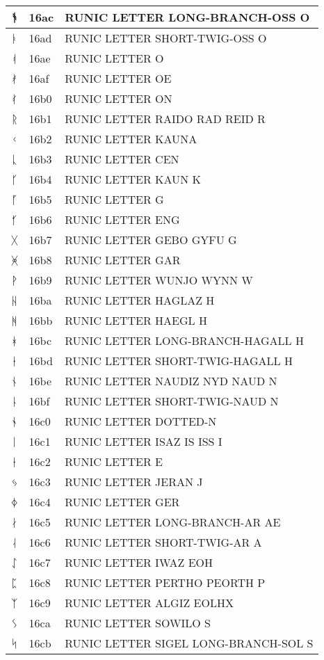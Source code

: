 \documentclass[12pt,letterpaper,openany]{book}
\begin{document}
\begin{center}
\begin{supertabular}{|m{0.25in}|m{0.5in}|m{4in}|}
ᚬ & 16ac & RUNIC LETTER LONG-BRANCH-OSS O\\\hline
ᚭ & 16ad & RUNIC LETTER SHORT-TWIG-OSS O\\\hline
ᚮ & 16ae & RUNIC LETTER O\\\hline
ᚯ & 16af & RUNIC LETTER OE\\\hline
ᚰ & 16b0 & RUNIC LETTER ON\\\hline
ᚱ & 16b1 & RUNIC LETTER RAIDO RAD REID R\\\hline
ᚲ & 16b2 & RUNIC LETTER KAUNA\\\hline
ᚳ & 16b3 & RUNIC LETTER CEN\\\hline
ᚴ & 16b4 & RUNIC LETTER KAUN K\\\hline
ᚵ & 16b5 & RUNIC LETTER G\\\hline
ᚶ & 16b6 & RUNIC LETTER ENG\\\hline
ᚷ & 16b7 & RUNIC LETTER GEBO GYFU G\\\hline
ᚸ & 16b8 & RUNIC LETTER GAR\\\hline
ᚹ & 16b9 & RUNIC LETTER WUNJO WYNN W\\\hline
ᚺ & 16ba & RUNIC LETTER HAGLAZ H\\\hline
ᚻ & 16bb & RUNIC LETTER HAEGL H\\\hline
ᚼ & 16bc & RUNIC LETTER LONG-BRANCH-HAGALL H\\\hline
ᚽ & 16bd & RUNIC LETTER SHORT-TWIG-HAGALL H\\\hline
ᚾ & 16be & RUNIC LETTER NAUDIZ NYD NAUD N\\\hline
ᚿ & 16bf & RUNIC LETTER SHORT-TWIG-NAUD N\\\hline
ᛀ & 16c0 & RUNIC LETTER DOTTED-N\\\hline
ᛁ & 16c1 & RUNIC LETTER ISAZ IS ISS I\\\hline
ᛂ & 16c2 & RUNIC LETTER E\\\hline
ᛃ & 16c3 & RUNIC LETTER JERAN J\\\hline
ᛄ & 16c4 & RUNIC LETTER GER\\\hline
ᛅ & 16c5 & RUNIC LETTER LONG-BRANCH-AR AE\\\hline
ᛆ & 16c6 & RUNIC LETTER SHORT-TWIG-AR A\\\hline
ᛇ & 16c7 & RUNIC LETTER IWAZ EOH\\\hline
ᛈ & 16c8 & RUNIC LETTER PERTHO PEORTH P\\\hline
ᛉ & 16c9 & RUNIC LETTER ALGIZ EOLHX\\\hline
ᛊ & 16ca & RUNIC LETTER SOWILO S\\\hline
ᛋ & 16cb & RUNIC LETTER SIGEL LONG-BRANCH-SOL S\\\hline

\end{supertabular}
\end{center}
\end{document}
